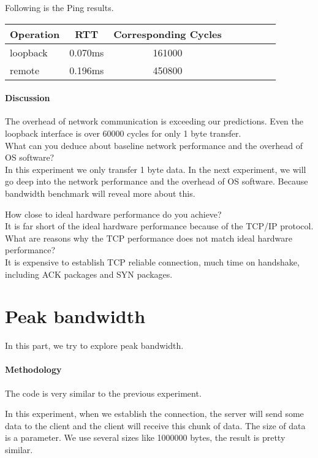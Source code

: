 Following is the Ping results.
\begin{center}
\begin{tabular}{l*{6}{c}r}
Operation       &  RTT & Corresponding Cycles\\
\hline
loopback & 0.070ms & 161000 \\
remote & 0.196ms &  450800 \\
\end{tabular}
\end{center}

\paragraph{Discussion}
The overhead of network communication is exceeding our predictions. Even the loopback interface is over 60000 cycles for only 1 byte transfer. \\


What can you deduce about baseline network performance and the overhead of OS software?  \\
In this experiment we only transfer 1 byte data. In the next experiment, we will go deep into the network performance and the overhead of OS software. Because bandwidth benchmark will reveal more about this.

How close to ideal hardware performance do you achieve? \\ 
It is far short of the ideal hardware performance because of the TCP/IP protocol.\\


What are reasons why the TCP performance does not match ideal hardware performance?  \\
It is expensive to establish TCP reliable connection, much time on handshake, including ACK packages and SYN packages.

\section{Peak bandwidth}
In this part, we try to explore peak bandwidth.

\paragraph{Methodology}
The code is very similar to the previous experiment.

In this experiment, when we establish the connection, the server will send some data to the client and the client will receive this chunk of data. The size of data is a parameter. We use several sizes like 1000000 bytes, the result is pretty similar.

